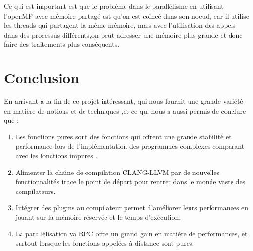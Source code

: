 \documentclass[12pt,a4paper]{article}
\begin{document}
Ce qui est important est que le problème dans le parallélisme en utilisant l'openMP avec mémoire partagé est qu'on est coincé dans son noeud, car il utilise les threads qui partagent la même mémoire, mais avec l'utilisation des appels dans des processus différents,on peut adresser une mémoire plus grande et donc faire des traitements plus conséquents.


\pagebreak

\section{Conclusion}







En arrivant à la fin de ce projet intéressant, qui nous fournit une grande variété en matière de notions et de techniques ,et ce qui nous a aussi permis de conclure que :

\begin{enumerate}
    \item Les fonctions pures sont des fonctions qui offrent une grande stabilité et performance lors de l'implémentation des programmes complexes comparant avec les fonctions impures .
    
    \item Alimenter la chaı̂ne de compilation CLANG-LLVM par de nouvelles fonctionnalités trace le point de départ pour rentrer dans le monde vaste des compilateurs.
    
    \item Intégrer des plugins au compilateur permet d’améliorer leurs performances en jouant sur la mémoire réservée et le temps d’exécution.
    
    \item La parallélisation va RPC offre un grand gain en matière de performances, et surtout lorsque les fonctions appelées à distance sont pures.
    
  \end{enumerate}  



\pagebreak 

\nocite{*} 



\end{document}
